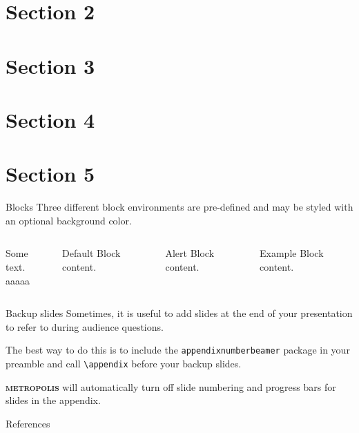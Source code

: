 \documentclass[10pt]{beamer}
\newcommand{\themename}{\textbf{\textsc{metropolis}}\xspace}
\begin{document}
\section{Section 2}

\section{Section 3}

\section{Section 4}

\section{Section 5}

\begin{frame}{Blocks}
    Three different block environments are pre-defined and may be styled with an
    optional background color.
  
    \begin{columns}[T,onlytextwidth]
          
            Some text.\\[2cm]
            aaaaa
    
    
          \begin{block}{Default}
            Block content.
          \end{block}
    
          \begin{alertblock}{Alert}
            Block content.
          \end{alertblock}
    
          \begin{exampleblock}{Example}
            Block content.
          \end{exampleblock}
    
      \end{columns}

  \end{frame}

\appendix

\begin{frame}[fragile]{Backup slides}
  Sometimes, it is useful to add slides at the end of your presentation to
  refer to during audience questions.

  The best way to do this is to include the \verb|appendixnumberbeamer|
  package in your preamble and call \verb|\appendix| before your backup slides.

  \themename will automatically turn off slide numbering and progress bars for
  slides in the appendix.  \cite{ConcreteMath}
\end{frame}

\begin{frame}[allowframebreaks]{References}

  
  

\end{frame}
\end{document}
